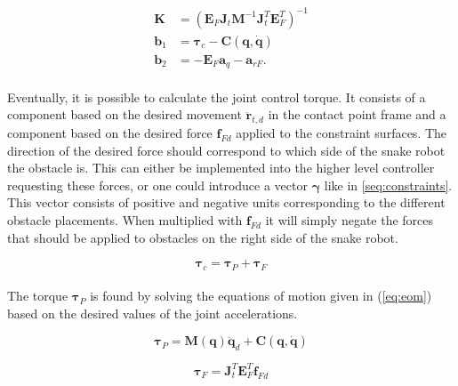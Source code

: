 \begin{equation}
    \begin{split}
        \mathbf{K} &= (\mathbf{E}_F \mathbf{J}_t \mathbf{M}^{-1} \mathbf{J}_t^T \mathbf{E}^T_F)^{-1}\\
        \mathbf{b}_1 &= \boldsymbol{\tau}_c - \mathbf{C(q, \dot{q})}\\
        \mathbf{b}_2 &= - \mathbf{E}_F \mathbf{a}_q - \mathbf{a}_{rF}.
    \end{split}
\end{equation}
\\
Eventually, it is possible to calculate the joint control torque. It consists of a component based on the desired movement $\mathbf{\ddot{r}}_{t,d}$ in the contact point frame and a component based on the desired force $\mathbf{f}_{Fd}$ applied to the constraint surfaces. The direction of the desired force should correspond to which side of the snake robot the obstacle is. This can either be implemented into the higher level controller requesting these forces, or one could introduce a vector $\boldsymbol{\gamma}$ like in \ref{seq:constraints}. This vector consists of positive and negative units corresponding to the different obstacle placements. When multiplied with $\mathbf{f}_{Fd}$ it will simply negate the forces that should be applied to obstacles on the right side of the snake robot.

\begin{equation}\label{eq:dhpfc_tau_c}
    \boldsymbol{\tau}_c = \boldsymbol{\tau}_P + \boldsymbol{\tau}_F
\end{equation}
\\
The torque $\boldsymbol{\tau}_P$ is found by solving the equations of motion given in (\ref{eq:eom}) based on the desired values of the joint accelerations.

\begin{equation}\label{eq:dhpfc_taup}
    \boldsymbol{\tau}_P = \mathbf{M(q)} \ddot{\mathbf{q}}_d + \mathbf{C}(\mathbf{q,\dot{q}})
\end{equation}

\begin{equation}\label{eq:dhpfc_tauf}
    \boldsymbol{\tau}_F = \mathbf{J}_t^T \mathbf{E}^T_F \mathbf{f}_{Fd}
\end{equation}

